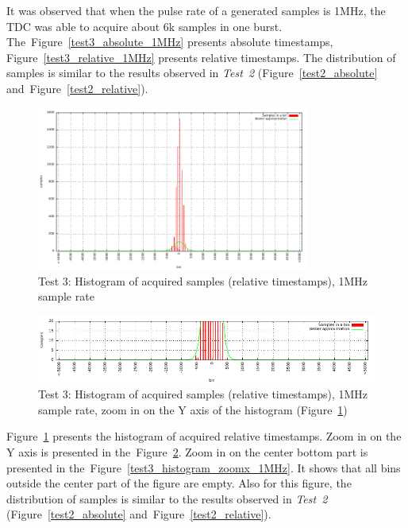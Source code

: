 \documentclass[a4paper, 12pt]{article}
\begin{document}
It was observed that when the pulse rate of a generated samples is 1MHz,
the TDC was able to acquire about 6k samples in one burst.
The~Figure~\ref{test3_absolute_1MHz} presents absolute timestamps,
Figure~\ref{test3_relative_1MHz} presents relative timestamps.
The distribution of samples is similar to the results observed in
\textit{Test~2} (Figure~\ref{test2_absolute} and~Figure~\ref{test2_relative}).

\FloatBarrier
\begin{figure}[ht!]
  \centering
  \includegraphics[width=0.80\textwidth]{img/test3_histogram_1MHz.pdf}
  \caption{Test 3: Histogram of acquired samples (relative timestamps),
           1MHz sample rate}
  \label{test3_histogram_1MHz}
\end{figure}

\begin{figure}[ht!]
  \centering
  \includegraphics[width=1\textwidth]{img/test3_histogram_zoomy_1MHz.pdf}
  \caption{Test 3: Histogram of acquired samples (relative timestamps),
           1MHz sample rate, zoom in on the Y axis of the histogram
           (Figure~\ref{test3_histogram_1MHz})}
  \label{test3_histogram_zoomy_1MHz}
\end{figure}

Figure~\ref{test3_histogram_1MHz} presents the histogram of acquired relative
timestamps. Zoom in on the Y axis is presented in
the~Figure~\ref{test3_histogram_zoomy_1MHz}.
Zoom in on the center bottom part is presented in
the~Figure~\ref{test3_histogram_zoomx_1MHz}.
It shows that all bins outside the center part of the figure are empty.
Also for this figure, the distribution of samples is similar to the results
observed in
\textit{Test~2} (Figure~\ref{test2_absolute} and~Figure~\ref{test2_relative}).
\end{document}

